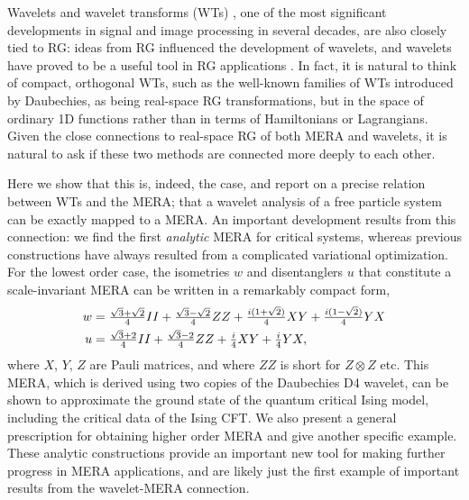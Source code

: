 \documentclass[aps,prl,twocolumn,showpacs,superscriptaddress,floatfix,10pt]{revtex4-1}
\begin{document}
Wavelets and wavelet transforms (WTs) \cite{Daub1,Daub2,Daub3,Daub4,WaveBook}, 
one of the most significant
developments in signal and image processing in several decades,
are also closely tied to RG: ideas from RG influenced the development of wavelets, and
wavelets have proved to be a useful tool in RG applications \cite{Battle}.
In fact, it is natural to think of compact, orthogonal WTs, such as the well-known families
of WTs introduced by Daubechies\cite{Daub1,Daub4}, as being real-space RG transformations, but
in the space of ordinary 1D functions rather than in terms of
Hamiltonians or Lagrangians.
Given the close connections to real-space RG of both MERA and wavelets,  
it is natural to ask if these two methods are connected more deeply to each other.

Here we show that this is, indeed, the case, and report on a precise relation
between WTs and the MERA; that a wavelet analysis of a free particle system can
be exactly mapped to a MERA.  An important development results
from this connection:  we find the first {\it analytic}  MERA for
critical systems, whereas previous constructions have
always resulted from a complicated variational optimization. 
For the lowest order case, the isometries $w$ and disentanglers $u$ that constitute a scale-invariant MERA can be written in a remarkably compact form,
\begin{align}
  w & = \tfrac{{\sqrt 3  + \sqrt 2 }}{4}II + \tfrac{{\sqrt 3  - \sqrt 2 }}{4}ZZ + \tfrac{{i(1 + \sqrt 2 )}}{4}XY + \tfrac{{i(1 - \sqrt 2 )}}{4}YX \hfill \nonumber\\
  u & = \tfrac{{\sqrt 3  + 2}}{4}II + \tfrac{{\sqrt 3  - 2}}{4}ZZ + \tfrac{i}{4}XY + \tfrac{i}{4}YX, \label{eq:16}
\end{align}
where $X$, $Y$, $Z$ are Pauli matrices, and
where $ZZ$ is short for $Z\otimes Z$ etc. 
This MERA, which is derived using two copies of the Daubechies D4 wavelet, 
can be shown to approximate the ground state of the quantum critical Ising model, 
including the critical data of the Ising CFT. 
We also present a general prescription for obtaining higher order MERA and give another specific example.
These analytic constructions provide an important
new tool for making further progress in MERA applications, and are
likely just the first example of important results from the
wavelet-MERA connection.
\end{document}
